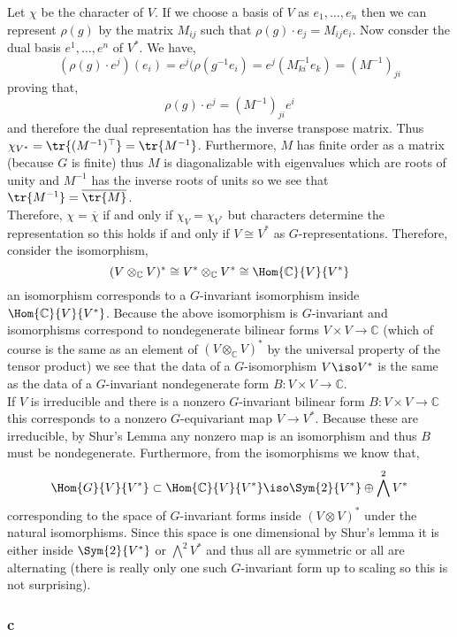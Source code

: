 \documentclass[12pt]{article}
\renewcommand{\C}{\mathbb{C}}
\begin{document}
Let $\chi$ be the character of $V$. If we choose a basis of $V$ as $e_1, \dots, e_n$ then we can represent $\rho(g)$ by the matrix $M_{ij}$ such that $\rho(g) \cdot e_j = M_{ij} e_i$. Now consder the dual basis $e^1, \dots, e^n$ of $V^*$. We have,
\[ (\rho(g) \cdot e^j)(e_i) = e^j(\rho(g^{-1} e_i) = e^j (M^{-1}_{ki} e_k) = (M^{-1})_{ji} \]
proving that,
\[ \rho(g) \cdot e^j = (M^{-1})_{ji} e^i \]
and therefore the dual representation has the inverse transpose matrix. Thus $\chi_{V^*} = \tr{(M^{-1})^\top} = \tr{M^{-1}}$. Furthermore, $M$ has finite order as a matrix (because $G$ is finite) thus $M$ is diagonalizable with eigenvalues which are roots of unity and $M^{-1}$ has the inverse roots of units so we see that $\tr{M^{-1}} = \overline{\tr{M}}$.
\bigskip\\
Therefore, $\chi = \overline{\chi}$ if and only if $\chi_V = \chi_{V^*}$ but characters determine the representation so this holds if and only if $V \cong V^*$ as $G$-representations. Therefore, consider the isomorphism,
\[ (V \otimes_\C V)^* \cong V^* \otimes_\C V^* \cong \Hom{\C}{V}{V^*} \]
an isomorphism corresponds to a $G$-invariant isomorphism inside $\Hom{\C}{V}{V^*}$. Because the above isomorphism is $G$-invariant and isomorphisms correspond to nondegenerate bilinear forms $V \times V \to \C$ (which of course is the same as an element of $(V \otimes_\C V)^*$ by the universal property of the tensor product) we see that the data of a $G$-isomorphism $V \iso V^*$ is the same as the data of a $G$-invariant nondegenerate form $B : V \times V \to \C$.
\bigskip\\
If $V$ is irreducible and there is a nonzero $G$-invariant bilinear form $B : V \times V \to \C$ this corresponds to a nonzero $G$-equivariant map $V \to V^*$. Because these are irreducible, by Shur's Lemma any nonzero map is an isomorphism and thus $B$ must be nondegenerate. Furthermore, from the isomorphisms we know that,
\[ \Hom{G}{V}{V^*} \subset \Hom{\C}{V}{V^*} \iso \Sym{2}{V^*} \oplus \bigwedge^2 V^* \]
corresponding to the space of $G$-invariant forms inside $(V \otimes V)^*$ under the natural isomorphisms. Since this space is one dimensional by Shur's lemma it is either inside $\Sym{2}{V^*}$ or $\bigwedge^2 V^*$ and thus all are symmetric or all are alternating (there is really only one such $G$-invariant form up to scaling so this is not surprising).

\subsubsection{c}
\end{document}
